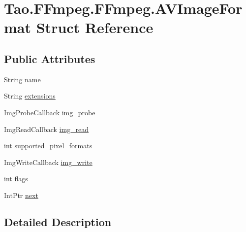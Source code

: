 \hypertarget{struct_tao_1_1_f_fmpeg_1_1_f_fmpeg_1_1_a_v_image_format}{
\section{Tao.FFmpeg.FFmpeg.AVImageFormat Struct Reference}
\label{struct_tao_1_1_f_fmpeg_1_1_f_fmpeg_1_1_a_v_image_format}
}
\subsection*{Public Attributes}
\begin{DoxyCompactItemize}
\item 
String \hyperlink{struct_tao_1_1_f_fmpeg_1_1_f_fmpeg_1_1_a_v_image_format_a64df8b0c1cee507a37d17271cf7ad60e}{name}
\item 
String \hyperlink{struct_tao_1_1_f_fmpeg_1_1_f_fmpeg_1_1_a_v_image_format_a2276abd99449cfe819999d1349e83f66}{extensions}
\item 
ImgProbeCallback \hyperlink{struct_tao_1_1_f_fmpeg_1_1_f_fmpeg_1_1_a_v_image_format_a582e4fcd1de7ff360d659f34ea039793}{img\_\-probe}
\item 
ImgReadCallback \hyperlink{struct_tao_1_1_f_fmpeg_1_1_f_fmpeg_1_1_a_v_image_format_a894e93c491833f8bb2f96c8233c79f70}{img\_\-read}
\item 
int \hyperlink{struct_tao_1_1_f_fmpeg_1_1_f_fmpeg_1_1_a_v_image_format_ade2a15b4f8d8d96ba35fa19595aea1fc}{supported\_\-pixel\_\-formats}
\item 
ImgWriteCallback \hyperlink{struct_tao_1_1_f_fmpeg_1_1_f_fmpeg_1_1_a_v_image_format_a8ce9ae50bdd6e2440b134c6c59212cb7}{img\_\-write}
\item 
int \hyperlink{struct_tao_1_1_f_fmpeg_1_1_f_fmpeg_1_1_a_v_image_format_ab4a2cd277689221a9a7649b7ce136b22}{flags}
\item 
IntPtr \hyperlink{struct_tao_1_1_f_fmpeg_1_1_f_fmpeg_1_1_a_v_image_format_a23dc0c4c25d4246305216cf322ed31c5}{next}
\end{DoxyCompactItemize}


\subsection{Detailed Description}


